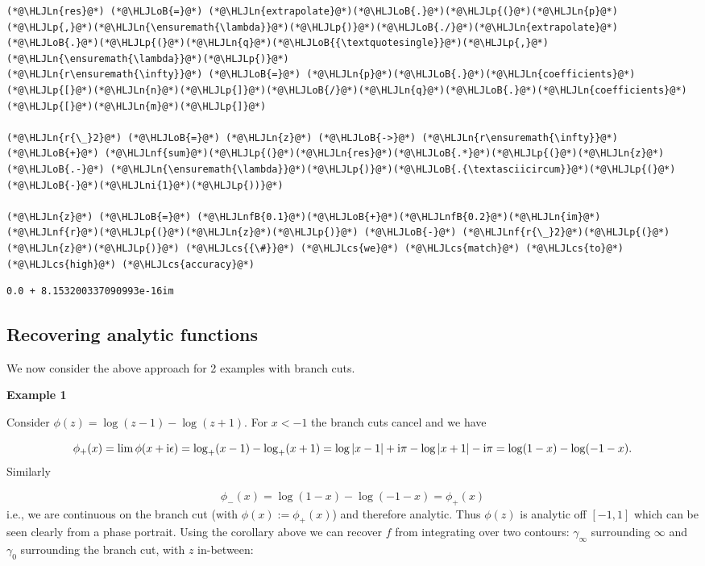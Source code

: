 \documentclass[12pt,a4paper]{article}
\newcommand{\HLJLn}[1]{#1}
\newcommand{\HLJLnf}[1]{\textcolor[RGB]{66,102,213}{#1}}
\newcommand{\HLJLnfB}[1]{\textcolor[RGB]{59,151,46}{#1}}
\newcommand{\HLJLni}[1]{\textcolor[RGB]{59,151,46}{#1}}
\newcommand{\HLJLoB}[1]{\textcolor[RGB]{102,102,102}{\textbf{#1}}}
\newcommand{\HLJLp}[1]{#1}
\newcommand{\HLJLcs}[1]{\textcolor[RGB]{153,153,119}{\textit{#1}}}
\def\I{ {\rm i} }
\begin{document}
\begin{lstlisting}
(*@\HLJLn{res}@*) (*@\HLJLoB{=}@*) (*@\HLJLn{extrapolate}@*)(*@\HLJLoB{.}@*)(*@\HLJLp{(}@*)(*@\HLJLn{p}@*)(*@\HLJLp{,}@*)(*@\HLJLn{\ensuremath{\lambda}}@*)(*@\HLJLp{)}@*)(*@\HLJLoB{./}@*)(*@\HLJLn{extrapolate}@*)(*@\HLJLoB{.}@*)(*@\HLJLp{(}@*)(*@\HLJLn{q}@*)(*@\HLJLoB{{\textquotesingle}}@*)(*@\HLJLp{,}@*)(*@\HLJLn{\ensuremath{\lambda}}@*)(*@\HLJLp{)}@*)
(*@\HLJLn{r\ensuremath{\infty}}@*) (*@\HLJLoB{=}@*) (*@\HLJLn{p}@*)(*@\HLJLoB{.}@*)(*@\HLJLn{coefficients}@*)(*@\HLJLp{[}@*)(*@\HLJLn{n}@*)(*@\HLJLp{]}@*)(*@\HLJLoB{/}@*)(*@\HLJLn{q}@*)(*@\HLJLoB{.}@*)(*@\HLJLn{coefficients}@*)(*@\HLJLp{[}@*)(*@\HLJLn{m}@*)(*@\HLJLp{]}@*)

(*@\HLJLn{r{\_}2}@*) (*@\HLJLoB{=}@*) (*@\HLJLn{z}@*) (*@\HLJLoB{->}@*) (*@\HLJLn{r\ensuremath{\infty}}@*) (*@\HLJLoB{+}@*) (*@\HLJLnf{sum}@*)(*@\HLJLp{(}@*)(*@\HLJLn{res}@*)(*@\HLJLoB{.*}@*)(*@\HLJLp{(}@*)(*@\HLJLn{z}@*) (*@\HLJLoB{.-}@*) (*@\HLJLn{\ensuremath{\lambda}}@*)(*@\HLJLp{)}@*)(*@\HLJLoB{.{\textasciicircum}}@*)(*@\HLJLp{(}@*)(*@\HLJLoB{-}@*)(*@\HLJLni{1}@*)(*@\HLJLp{))}@*)

(*@\HLJLn{z}@*) (*@\HLJLoB{=}@*) (*@\HLJLnfB{0.1}@*)(*@\HLJLoB{+}@*)(*@\HLJLnfB{0.2}@*)(*@\HLJLn{im}@*)
(*@\HLJLnf{r}@*)(*@\HLJLp{(}@*)(*@\HLJLn{z}@*)(*@\HLJLp{)}@*) (*@\HLJLoB{-}@*) (*@\HLJLnf{r{\_}2}@*)(*@\HLJLp{(}@*)(*@\HLJLn{z}@*)(*@\HLJLp{)}@*) (*@\HLJLcs{{\#}}@*) (*@\HLJLcs{we}@*) (*@\HLJLcs{match}@*) (*@\HLJLcs{to}@*) (*@\HLJLcs{high}@*) (*@\HLJLcs{accuracy}@*)
\end{lstlisting}

\begin{lstlisting}
0.0 + 8.153200337090993e-16im
\end{lstlisting}


\subsection{Recovering analytic functions}
We now consider the above approach for 2 examples with branch cuts.

\textbf{Example 1}

Consider $\phi(z) = \log(z-1) - \log(z+1)$. For $x < -1$ the branch cuts cancel  and we have

\[
\phi_+(x) = \lim \phi(x + \I \epsilon) = \log_+(x-1) - \log_+(x+1) = 
\log|x-1| + \I \pi - \log|x+1| - \I \pi = \log(1-x) - \log(-1-x).
\]
Similarly

\[
\phi_-(x) =  \log(1-x) - \log(-1-x) = \phi_+(x)
\]
i.e., we are continuous on the branch cut (with $\phi(x) := \phi_+(x)$) and therefore analytic. Thus $\phi(z)$ is analytic off $[-1,1]$ which can be seen clearly from a phase portrait. Using the corollary above we can recover $f$ from integrating over two contours: $\gamma_\infty$ surrounding $\infty$  and $\gamma_0$ surrounding the branch cut, with $z$ in-between:
\end{document}
